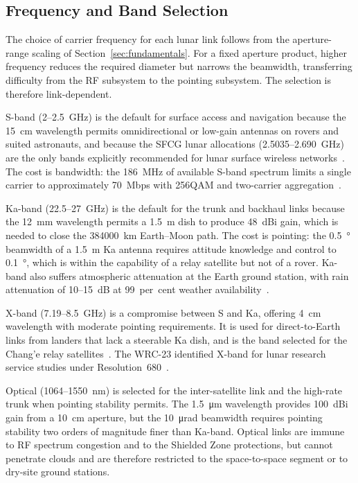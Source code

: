 \documentclass[11pt,a4paper]{article}
\begin{document}
\subsection{Frequency and Band Selection}
The choice of carrier frequency for each lunar link follows from the aperture-range scaling of Section~\ref{sec:fundamentals}. For a fixed aperture product, higher frequency reduces the required diameter but narrows the beamwidth, transferring difficulty from the RF subsystem to the pointing subsystem. The selection is therefore link-dependent.

S-band (\SI{2}{}--\SI{2.5}{GHz}) is the default for surface access and navigation because the \SI{15}{cm} wavelength permits omnidirectional or low-gain antennas on rovers and suited astronauts, and because the SFCG lunar allocations (\SI{2.5035}{}--\SI{2.690}{GHz}) are the only bands explicitly recommended for lunar surface wireless networks~\cite{sfcg_rec32}. The cost is bandwidth: the \SI{186}{MHz} of available S-band spectrum limits a single carrier to approximately \SI{70}{Mbps} with 256QAM and two-carrier aggregation~\cite{nokia_lunar_3gpp}.

Ka-band (\SI{22.5}{}--\SI{27}{GHz}) is the default for the trunk and backhaul links because the \SI{12}{mm} wavelength permits a \SI{1.5}{m} dish to produce \SI{48}{dBi} gain, which is needed to close the \SI{384000}{km} Earth--Moon path. The cost is pointing: the \SI{0.5}{\degree} beamwidth of a \SI{1.5}{m} Ka antenna requires attitude knowledge and control to \SI{0.1}{\degree}, which is within the capability of a relay satellite but not of a rover. Ka-band also suffers atmospheric attenuation at the Earth ground station, with rain attenuation of \SI{10}{}--\SI{15}{dB} at 99~per~cent weather availability~\cite{dsn_810_005,islam_ka_band}.

X-band (\SI{7.19}{}--\SI{8.5}{GHz}) is a compromise between S and Ka, offering \SI{4}{cm} wavelength with moderate pointing requirements. It is used for direct-to-Earth links from landers that lack a steerable Ka dish, and is the band selected for the Chang'e relay satellites~\cite{chen_ce4_relay}. The WRC-23 identified X-band for lunar research service studies under Resolution~680~\cite{itu_wrc23_res680}.

Optical (\SI{1064}{}--\SI{1550}{nm}) is selected for the inter-satellite link and the high-rate trunk when pointing stability permits. The \SI{1.5}{\micro\m} wavelength provides \SI{100}{dBi} gain from a \SI{10}{cm} aperture, but the \SI{10}{\micro\radian} beamwidth requires pointing stability two orders of magnitude finer than Ka-band. Optical links are immune to RF spectrum congestion and to the Shielded Zone protections, but cannot penetrate clouds and are therefore restricted to the space-to-space segment or to dry-site ground stations.
\end{document}
